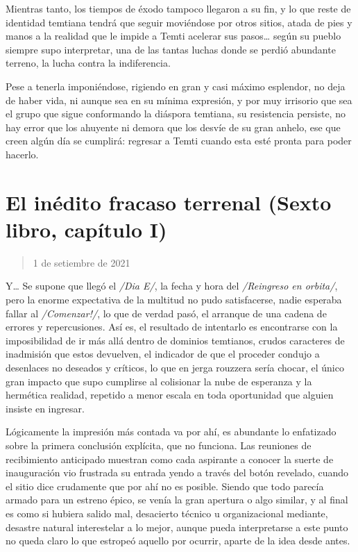 \documentclass[
]{book}
\begin{document}
Mientras tanto, los tiempos de éxodo tampoco llegaron a su fin, y lo que reste de identidad temtiana tendrá que seguir moviéndose por otros sitios, atada de pies y manos a la realidad que le impide a Temti acelerar sus pasos\ldots{} según su pueblo siempre supo interpretar, una de las tantas luchas donde se perdió abundante terreno, la lucha contra la indiferencia.

Pese a tenerla imponiéndose, rigiendo en gran y casi máximo esplendor, no deja de haber vida, ni aunque sea en su mínima expresión, y por muy irrisorio que sea el grupo que sigue conformando la diáspora temtiana, su resistencia persiste, no hay error que los ahuyente ni demora que los desvíe de su gran anhelo, ese que creen algún día se cumplirá: regresar a Temti cuando esta esté pronta para poder hacerlo.

\hypertarget{el-inuxe9dito-fracaso-terrenal-sexto-libro-capuxedtulo-i}{%
\section{El inédito fracaso terrenal (Sexto libro, capítulo I)}\label{el-inuxe9dito-fracaso-terrenal-sexto-libro-capuxedtulo-i}}

\begin{quote}
1 de setiembre de 2021
\end{quote}

Y\ldots{} Se supone que llegó el \emph{/Dia E/}, la fecha y hora del \emph{/Reingreso en orbita/}, pero la enorme expectativa de la multitud no pudo satisfacerse, nadie esperaba fallar al \emph{/Comenzar!/}, lo que de verdad pasó, el arranque de una cadena de errores y repercusiones. Así es, el resultado de intentarlo es encontrarse con la imposibilidad de ir más allá dentro de dominios temtianos, crudos caracteres de inadmisión que estos devuelven, el indicador de que el proceder condujo a desenlaces no deseados y críticos, lo que en jerga rouzzera sería chocar, el único gran impacto que supo cumplirse al colisionar la nube de esperanza y la hermética realidad, repetido a menor escala en toda oportunidad que alguien insiste en ingresar.

Lógicamente la impresión más contada va por ahí, es abundante lo enfatizado sobre la primera conclusión explícita, que no funciona. Las reuniones de recibimiento anticipado muestran como cada aspirante a conocer la suerte de inauguración vio frustrada su entrada yendo a través del botón revelado, cuando el sitio dice crudamente que por ahí no es posible. Siendo que todo parecía armado para un estreno épico, se venía la gran apertura o algo similar, y al final es como si hubiera salido mal, desacierto técnico u organizacional mediante, desastre natural interestelar a lo mejor, aunque pueda interpretarse a este punto no queda claro lo que estropeó aquello por ocurrir, aparte de la idea desde antes.
\end{document}
